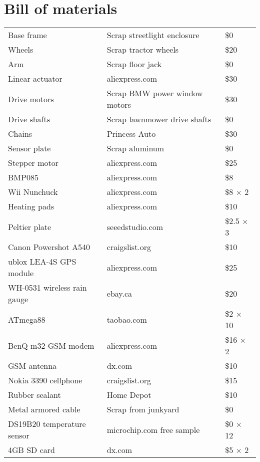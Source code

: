 \chapter{Bill of materials}%

\begin{longtable}{ |l|l|l| }

  \hline
  Base frame & Scrap streetlight enclosure & \$0 \\
  Wheels & Scrap tractor wheels & \$20 \\
  Arm & Scrap floor jack & \$0 \\
  Linear actuator & aliexpress.com & \$30 \\
  Drive motors & Scrap BMW power window motors & \$30 \\
  Drive shafts & Scrap lawnmower drive shafts & \$0 \\
  Chains & Princess Auto & \$30 \\
  Sensor plate & Scrap aluminum & \$0 \\
  Stepper motor & aliexpress.com & \$25 \\
  BMP085 & aliexpress.com & \$8 \\
  Wii Nunchuck & aliexpress.com & \$8 $\times$ 2 \\
  Heating pads & aliexpress.com & \$10 \\
  Peltier plate & seeedstudio.com & \$2.5 $\times$ 3 \\
  Canon Powershot A540 & craigslist.org & \$10 \\
  ublox LEA-4S GPS module & aliexpress.com & \$25 \\
  WH-0531 wireless rain gauge & ebay.ca & \$20 \\
  ATmega88 & taobao.com & \$2 $\times$ 10 \\
  BenQ m32 GSM modem & aliexpress.com & \$16 $\times$ 2 \\
  GSM antenna & dx.com & \$10 \\
  Nokia 3390 cellphone & craigslist.org & \$15 \\
  Rubber sealant & Home Depot & \$10 \\
  Metal armored cable & Scrap from junkyard & \$0 \\
  DS19B20 temperature sensor & microchip.com free sample & \$0 $\times$ 12 \\
  4GB SD card & dx.com & \$5 $\times$ 2 \\

\end{longtable}
